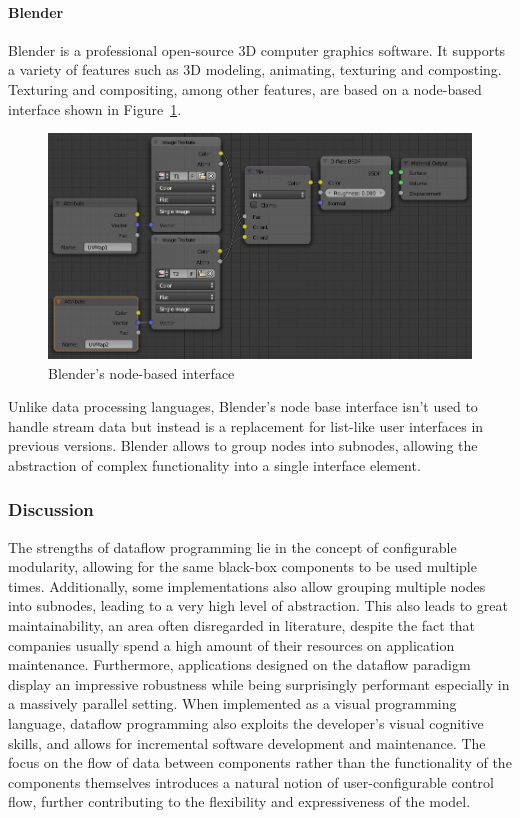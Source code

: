 \documentclass[11pt,a4paper]{globis-book}
\begin{document}
\paragraph*{Blender}
Blender is a professional open-source 3D computer graphics software. It supports a variety of features such as 3D modeling, animating, texturing and composting. Texturing and compositing, among other features, are based on a node-based interface shown in Figure~\ref{fig:blender}.

\begin{figure}[h]
  \centering
  \includegraphics[width=\textwidth]{resources/Blender.png}
  \caption{Blender's node-based interface}
  \label{fig:blender}
\end{figure}

Unlike data processing languages, Blender's node base interface isn't used to handle stream data but instead is a replacement for list-like user interfaces in previous versions. Blender allows to group nodes into subnodes, allowing the abstraction of complex functionality into a single interface element.

\subsubsection*{Discussion}
The strengths of dataflow programming lie in the concept of configurable modularity, allowing for the same black-box components to be used multiple times. Additionally, some implementations also allow grouping multiple nodes into subnodes, leading to a very high level of abstraction. This also leads to great maintainability, an area often disregarded in literature, despite the fact that companies usually spend a high amount of their resources on application maintenance. Furthermore, applications designed on the dataflow paradigm display an impressive robustness while being surprisingly performant especially in a massively parallel setting. When implemented as a visual programming language, dataflow programming also exploits the developer's visual cognitive skills, and allows for incremental software development and maintenance. The focus on the flow of data between components rather than the functionality of the components themselves introduces a natural notion of user-configurable control flow, further contributing to the flexibility and expressiveness of the model.
\end{document}
